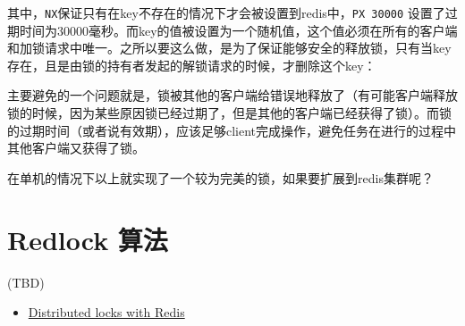 \documentclass[12pt]{article}
\begin{document}
其中，\texttt{NX}保证只有在key不存在的情况下才会被设置到redis中，\texttt{PX\ 30000} 设置了过期时间为30000毫秒。而key的值被设置为一个随机值，这个值必须在所有的客户端和加锁请求中唯一。之所以要这么做，是为了保证能够安全的释放锁，只有当key存在，且是由锁的持有者发起的解锁请求的时候，才删除这个key：

\begin{Shaded}
\begin{Highlighting}[]
 \OperatorTok{(}\OperatorTok{,}\OperatorTok{[}\OperatorTok{])} \OperatorTok{==} \OperatorTok{[}\OperatorTok{]} 
     \OperatorTok{(}\OperatorTok{,}\OperatorTok{[}\OperatorTok{])}
     
\end{Highlighting}
\end{Shaded}

主要避免的一个问题就是，锁被其他的客户端给错误地释放了（有可能客户端释放锁的时候，因为某些原因锁已经过期了，但是其他的客户端已经获得了锁）。而锁的过期时间（或者说有效期），应该足够client完成操作，避免任务在进行的过程中其他客户端又获得了锁。

在单机的情况下以上就实现了一个较为完美的锁，如果要扩展到redis集群呢？

\section{Redlock 算法}\label{redlock-ux7b97ux6cd5}

(TBD)

\begin{itemize}
\tightlist
\item
  \href{https://redis.io/topics/distlock}{Distributed locks with Redis}
\end{itemize}
\end{document}
